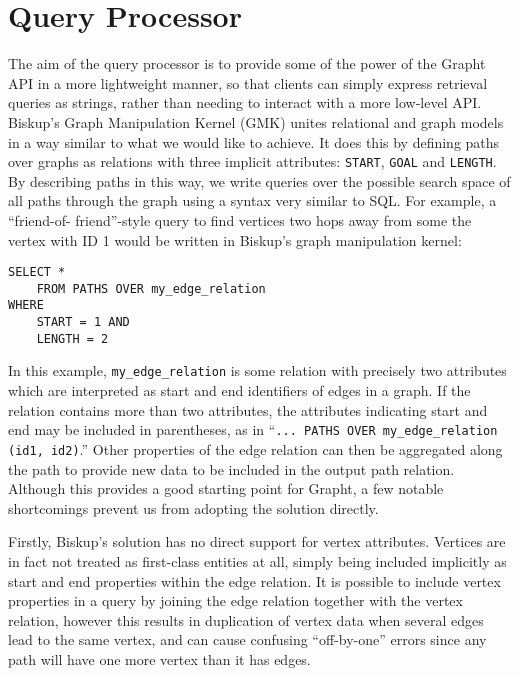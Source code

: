 \section{Query Processor}

The aim of the query processor is to provide some of the power of the Grapht
API in a more lightweight manner, so that clients can simply express retrieval
queries as strings, rather than needing to interact with a more low-level API.
Biskup's Graph Manipulation Kernel\cite{gSQL} (GMK) unites relational and
graph models in a way similar to what we would like to achieve. It does this
by defining paths over graphs as relations with three implicit attributes:
\texttt{START}, \texttt{GOAL} and \texttt{LENGTH}.  By describing paths in
this way, we write queries over the possible search space of all paths through
the graph using a syntax very similar to SQL. For example, a ``friend-of-
friend''-style query  to find vertices two hops away from some the vertex with
ID 1 would be written in Biskup's graph manipulation kernel:

\begin{verbatim}
SELECT *
    FROM PATHS OVER my_edge_relation
WHERE 
    START = 1 AND 
    LENGTH = 2 
\end{verbatim}

In this example, \texttt{my\_edge\_relation} is some relation with precisely two
attributes which are interpreted as start and end identifiers of edges in a
graph. If the relation contains more than two attributes, the attributes
indicating start and end may be included in parentheses, as in ``\texttt{...
PATHS OVER my\_edge\_relation (id1, id2)}.'' Other properties of the edge
relation can then be aggregated along the path to provide new data to be
included in the output path relation.  Although this provides a good starting
point for Grapht, a few notable shortcomings prevent us from adopting the
solution directly.

Firstly, Biskup's solution has no direct support for vertex attributes.
Vertices are in fact not treated as first-class entities at all, simply being
included implicitly as start and end properties within the edge relation. It
is possible to include vertex properties in a query by joining the edge
relation together with the vertex relation, however this results in
duplication of vertex data when several edges lead to the same vertex, and can
cause confusing ``off-by-one'' errors since any path will have one more vertex
than it has edges.


